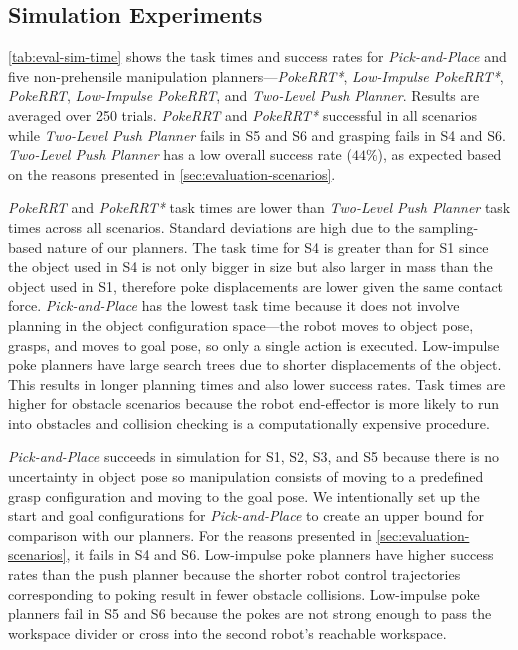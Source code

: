 

\subsection{Simulation Experiments}

\cref{tab:eval-sim-time} shows the task times and success rates for \textsl{Pick-and-Place} and five non-prehensile manipulation planners---\textsl{PokeRRT*},  \textsl{Low-Impulse PokeRRT*},  \textsl{PokeRRT},  \textsl{Low-Impulse PokeRRT}, and \textsl{Two-Level Push Planner}. Results are averaged over 250 trials. \textsl{PokeRRT} and \textsl{PokeRRT*} successful in all scenarios while \textsl{Two-Level Push Planner} fails in S5 and S6 and grasping fails in S4 and S6. \textsl{Two-Level Push Planner} has a low overall success rate ($44\%$), as expected based on the reasons presented in \cref{sec:evaluation-scenarios}.

\textsl{PokeRRT} and \textsl{PokeRRT*} task times are lower than \textsl{Two-Level Push Planner} task times across all scenarios. Standard deviations are high due to the sampling-based nature of our planners. The task time for S4 is greater than for S1 since the object used in S4 is not only bigger in size but also larger in mass than the object used in S1, therefore poke displacements are lower given the same contact force. \textsl{Pick-and-Place} has the lowest task time because it does not involve planning in the object configuration space---the robot moves to object pose, grasps, and moves to goal pose, so only a single action is executed. Low-impulse poke planners have large search trees due to shorter displacements of the object. This results in longer planning times and also lower success rates. Task times are higher for obstacle scenarios because the robot end-effector is more likely to run into obstacles and collision checking is a computationally expensive procedure.

\textsl{Pick-and-Place} succeeds in simulation for S1, S2, S3, and S5 because there is no uncertainty in object pose so manipulation consists of moving to a predefined grasp configuration and moving to the goal pose. We intentionally set up the start and goal configurations for \textsl{Pick-and-Place} to create an upper bound for comparison with our planners. For the reasons presented in \cref{sec:evaluation-scenarios}, it fails in S4 and S6. Low-impulse poke planners have higher success rates than the push planner because the shorter robot control trajectories corresponding to poking result in fewer obstacle collisions. Low-impulse poke planners fail in S5 and S6 because the pokes are not strong enough to pass the workspace divider or cross into the second robot's reachable workspace.


